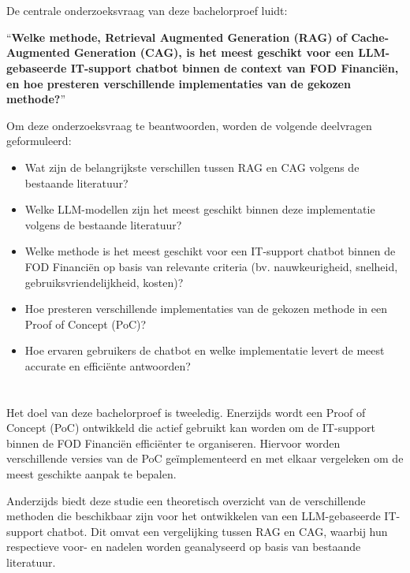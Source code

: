 \section{}%
\label{sec:onderzoeksvraag}

De centrale onderzoeksvraag van deze bachelorproef luidt:

“\textbf{Welke methode, Retrieval Augmented Generation (RAG) of Cache-Augmented Generation (CAG), is het meest geschikt voor een LLM-gebaseerde IT-support chatbot binnen de context van FOD Financiën, en hoe presteren verschillende implementaties van de gekozen methode?}”

Om deze onderzoeksvraag te beantwoorden, worden de volgende deelvragen geformuleerd:

\begin{itemize}
    \item Wat zijn de belangrijkste verschillen tussen RAG en CAG volgens de bestaande literatuur?
    \item Welke LLM-modellen zijn het meest geschikt binnen deze implementatie volgens de bestaande literatuur?
    \item Welke methode is het meest geschikt voor een IT-support chatbot binnen de FOD Financiën op basis van relevante criteria (bv. nauwkeurigheid, snelheid, gebruiksvriendelijkheid, kosten)?
    \item Hoe presteren verschillende implementaties van de gekozen methode in een Proof of Concept (PoC)?
    \item Hoe ervaren gebruikers de chatbot en welke implementatie levert de meest accurate en efficiënte antwoorden?
\end{itemize}

\section{}%
\label{sec:onderzoeksdoelstelling}

Het doel van deze bachelorproef is tweeledig. Enerzijds wordt een Proof of Concept (PoC) ontwikkeld die actief gebruikt kan worden om de IT-support binnen de FOD Financiën efficiënter te organiseren. Hiervoor worden verschillende versies van de PoC geïmplementeerd en met elkaar vergeleken om de meest geschikte aanpak te bepalen.

Anderzijds biedt deze studie een theoretisch overzicht van de verschillende methoden die beschikbaar zijn voor het ontwikkelen van een LLM-gebaseerde IT-support chatbot. Dit omvat een vergelijking tussen RAG en CAG, waarbij hun respectieve voor- en nadelen worden geanalyseerd op basis van bestaande literatuur.

